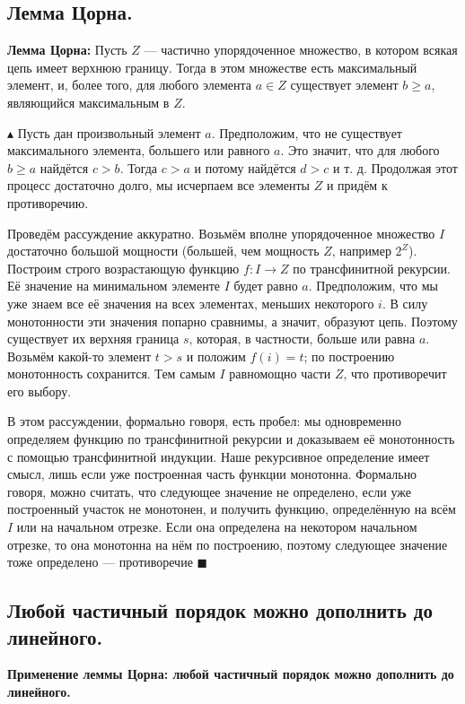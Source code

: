 \subsection{Лемма Цорна.}
\par \textbf{Лемма Цорна:} Пусть $Z$ — частично упорядоченное множество, в котором всякая цепь имеет верхнюю границу. Тогда в этом множестве есть максимальный элемент, и, более того, для любого элемента $a \in Z$ существует элемент $b \geq a$, являющийся максимальным в $Z$.
\par $\blacktriangle$ Пусть дан произвольный элемент $a$. Предположим, что не существует максимального элемента, большего или равного $a$. Это значит, что для любого $b \geq a$ найдётся $c > b$. Тогда $c > a$ и потому найдётся $d > c$ и т. д. Продолжая этот процесс достаточно долго, мы исчерпаем все элементы $Z$ и придём к противоречию.
\par Проведём рассуждение аккуратно. Возьмём вполне упорядоченное множество $I$ достаточно большой мощности (большей, чем
мощность $Z$, например $2^Z$). Построим строго возрастающую функцию $f : I \rightarrow Z$
по трансфинитной рекурсии. Её значение на минимальном элементе $I$ будет равно $a$. Предположим, что мы уже знаем все её значения на всех элементах, меньших некоторого $i$. В силу монотонности эти
значения попарно сравнимы, а значит, образуют цепь. Поэтому существует их верхняя граница $s$, которая, в частности, больше или равна $a$. Возьмём какой-то элемент $t > s$ и положим $f(i) = t$; по построению монотонность сохранится. Тем самым $I$ равномощно части $Z$, что противоречит его выбору.
\par В этом рассуждении, формально говоря, есть пробел: мы одновременно определяем функцию по трансфинитной рекурсии и доказываем её монотонность с помощью трансфинитной индукции. Наше рекурсивное определение имеет смысл, лишь если уже построенная
часть функции монотонна. Формально говоря, можно считать, что следующее значение не определено, если уже построенный участок не монотонен, и получить функцию, определённую на всём $I$ или на начальном отрезке. Если она определена
на некотором начальном отрезке, то она монотонна на нём по построению, поэтому следующее значение тоже определено — противоречие $\blacksquare$

\subsection{Любой частичный порядок можно дополнить до линейного.}

\textbf{Применение леммы Цорна: любой частичный порядок можно дополнить до линейного.}\\

